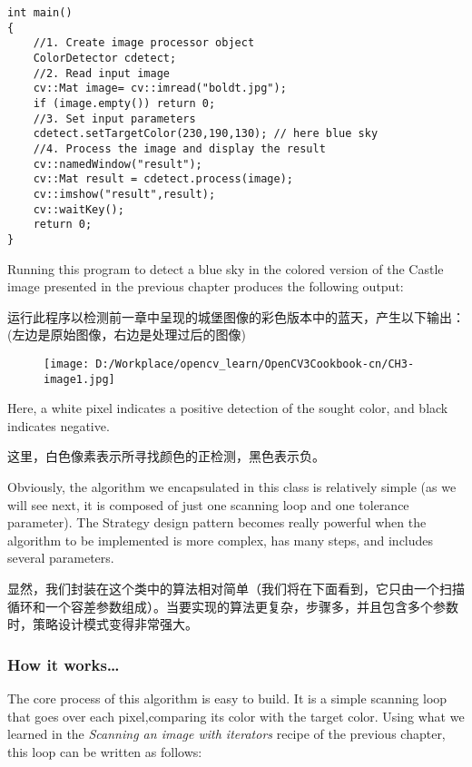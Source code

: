 \documentclass[]{article}
\begin{document}
\begin{verbatim}
int main()
{
    //1. Create image processor object
    ColorDetector cdetect;
    //2. Read input image
    cv::Mat image= cv::imread("boldt.jpg");
    if (image.empty()) return 0;
    //3. Set input parameters
    cdetect.setTargetColor(230,190,130); // here blue sky
    //4. Process the image and display the result
    cv::namedWindow("result");
    cv::Mat result = cdetect.process(image);
    cv::imshow("result",result);
    cv::waitKey();
    return 0;
}
\end{verbatim}

Running this program to detect a blue sky in the colored version of the
Castle image presented in the previous chapter produces the following
output:

运行此程序以检测前一章中呈现的城堡图像的彩色版本中的蓝天，产生以下输出：(左边是原始图像，右边是处理过后的图像)

\begin{figure}
\centering
\texttt{[image: D:/Workplace/opencv\_learn/OpenCV3Cookbook-cn/CH3-image1.jpg]}
\caption{}
\end{figure}

Here, a white pixel indicates a positive detection of the sought color,
and black indicates negative.

这里，白色像素表示所寻找颜色的正检测，黑色表示负。

Obviously, the algorithm we encapsulated in this class is relatively
simple (as we will see next, it is composed of just one scanning loop
and one tolerance parameter). The Strategy design pattern becomes really
powerful when the algorithm to be implemented is more complex, has many
steps, and includes several parameters.

显然，我们封装在这个类中的算法相对简单（我们将在下面看到，它只由一个扫描循环和一个容差参数组成）。当要实现的算法更复杂，步骤多，并且包含多个参数时，策略设计模式变得非常强大。

\hypertarget{header-n1180}{%
\subsubsection{How it works\ldots{}}\label{header-n1180}}

The core process of this algorithm is easy to build. It is a simple
scanning loop that goes over each pixel,comparing its color with the
target color. Using what we learned in the \emph{Scanning an image with
iterators} recipe of the previous chapter, this loop can be written as
follows:
\end{document}
